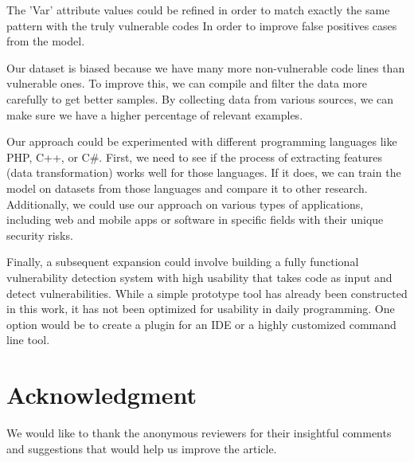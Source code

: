 \documentclass[journal,a4paper]{IEEEtran}
\begin{document}
The 'Var' attribute values could be refined in order to match exactly the same pattern with the truly vulnerable codes In order to improve false positives cases from the model.

Our dataset is biased because we have many more non-vulnerable code lines than vulnerable ones. To improve this, we can compile and filter the data more carefully to get better samples. By collecting data from various sources, we can make sure we have a higher percentage of relevant examples.

Our approach could be experimented with different programming languages like PHP, C++, or C\#. First, we need to see if the process of extracting features (data transformation) works well for those languages. If it does, we can train the model on datasets from those languages and compare it to other research. Additionally, we could use our approach on various types of applications, including web and mobile apps or software in specific fields with their unique security risks.

Finally, a subsequent expansion could involve building a fully functional vulnerability detection system with high usability that takes code as input and detect vulnerabilities. While a simple prototype tool has already been constructed in this work, it has not been optimized for usability in daily programming. One option would be to create a plugin for an IDE or a highly customized command line tool.

\section{Acknowledgment}

We would like to thank the anonymous reviewers
for their insightful comments and suggestions that would help us improve the article.

\small
 


%
\end{document}
